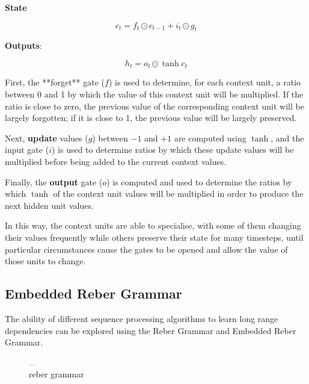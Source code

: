 \documentclass[11pt]{article}
\begin{document}
\textbf{State}

\[c_t = f_t \odot c_{t-1} + i_t \odot g_t\]

\textbf{Outputs}:

\[h_t = o_t \odot \tanh c_t\]

First, the **forget** gate ($f$) is used to determine, for each context unit,
a ratio between 0 and 1 by which the value of this context unit will be
multiplied.
If the ratio is close to zero, the previous value of the corresponding context
unit will be largely forgotten;
if it is close to 1, the previous value will be largely preserved.

Next, \textbf{update} values ($g$) between $-1$ and $+1$ are computed using
$\tanh$, and the input gate ($i$) is used to determine ratios by which these
update values will be multiplied before being added to the current context
values.

Finally, the \textbf{output} gate ($o$) is computed and used to determine the
ratios by which $\tanh$ of the context unit values will be multiplied in order
to produce the next hidden unit values.

In this way, the context units are able to specialise, with some of them
changing their values frequently while others preserve their state for many
timesteps, until particular circumstances cause the gates to be opened and
allow the value of those units to change.

\subsection{Embedded Reber Grammar}\label{subsec:embedded-reber-grammar}

The ability of different sequence processing algorithms to learn long range
dependencies can be explored using the Reber Grammar and Embedded Reber Grammar.
\begin{figure}[h]
    \centering
    \includegraphics[width=12,height=4]{../out/images/reber-grammar}
    \caption[reber grammar]{reber grammar}
    \label{fig: reber grammar}
\end{figure}
\end{document}

